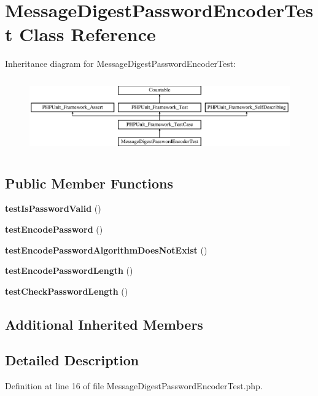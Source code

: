 \section{Message\+Digest\+Password\+Encoder\+Test Class Reference}
\label{class_symfony_1_1_component_1_1_security_1_1_core_1_1_tests_1_1_encoder_1_1_message_digest_password_encoder_test}
Inheritance diagram for Message\+Digest\+Password\+Encoder\+Test\+:\begin{figure}[H]
\begin{center}
\leavevmode
\includegraphics[height=3.218391cm]{class_symfony_1_1_component_1_1_security_1_1_core_1_1_tests_1_1_encoder_1_1_message_digest_password_encoder_test}
\end{center}
\end{figure}
\subsection*{Public Member Functions}
\begin{DoxyCompactItemize}
\item 
{\bf test\+Is\+Password\+Valid} ()
\item 
{\bf test\+Encode\+Password} ()
\item 
{\bf test\+Encode\+Password\+Algorithm\+Does\+Not\+Exist} ()
\item 
{\bf test\+Encode\+Password\+Length} ()
\item 
{\bf test\+Check\+Password\+Length} ()
\end{DoxyCompactItemize}
\subsection*{Additional Inherited Members}


\subsection{Detailed Description}


Definition at line 16 of file Message\+Digest\+Password\+Encoder\+Test.\+php.



